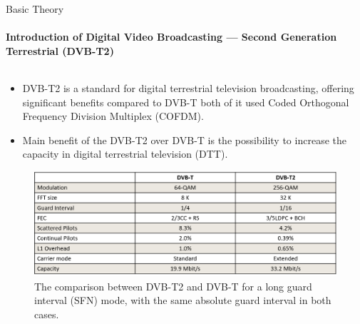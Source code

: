 \documentclass{beamer}
\begin{document}
\begin{frame}[shrink]{Basic Theory}
\framesubtitle{Introduction of Digital Video Broadcasting — Second Generation Terrestrial (DVB-T2)}
\begin{columns}[onlytextwidth]
\begin{column}{1\columnwidth}
\centering
\begin{itemize}\vspace{0cm}
\item \small DVB-T2 is a standard for digital terrestrial television broadcasting, offering significant benefits compared to  DVB-T both of it used Coded Orthogonal Frequency Division Multiplex (COFDM)\footnotemark[1]. 
\item \small Main benefit of the DVB-T2 over DVB-T is the possibility to increase the capacity in digital terrestrial television (DTT)\footnotemark[2].
\end{itemize}
\smallskip
\begin{center}
\begin{figure}
\includegraphics[scale=0.355]{pict/tabel.png}
\caption*{\tiny \centering The comparison between DVB-T2 and DVB-T for a long guard interval (SFN) mode, with the same absolute guard interval in both cases.}

\end{figure}
\end{center}
\end{column}
\end{columns}
%
\end{frame}
\end{document}
